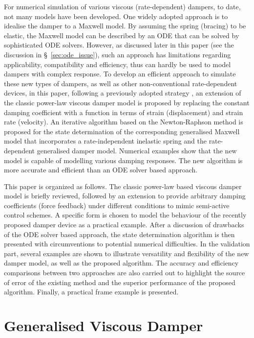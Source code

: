 For numerical simulation of various viscous (rate-dependent) dampers, to date, not many models have been developed. One widely adopted approach is to idealise the damper to a Maxwell model. By assuming the spring (bracing) to be elastic, the Maxwell model can be described by an ODE that can be solved by sophisticated ODE solvers. However, as discussed later in this paper (see the discussion in \S~\ref{sec:ode_issue}), such an approach has limitations regarding applicability, compatibility and efficiency, thus can hardly be used to model dampers with complex response. To develop an efficient approach to simulate these new types of dampers, as well as other non-conventional rate-dependent devices, in this paper, following a previously adopted strategy \citep[see, e.g.,][]{Symans1997,Symans1999a}, an extension of the classic power-law viscous damper model is proposed by replacing the constant damping coefficient with a function in terms of strain (displacement) and strain rate (velocity). An iterative algorithm based on the Newton-Raphson method is proposed for the state determination of the corresponding generalised Maxwell model that incorporates a rate-independent inelastic spring and the rate-dependent generalised damper model. Numerical examples show that the new model is capable of modelling various damping responses. The new algorithm is more accurate and efficient than an ODE solver based approach.

This paper is organized as follows. The classic power-law based viscous damper model is briefly reviewed, followed by an extension to provide arbitrary damping coefficients (force feedback) under different conditions to mimic semi-active control schemes. A specific form is chosen to model the behaviour of the recently proposed damper device \citep{Hazaveh2017} as a practical example. After a discussion of drawbacks of the ODE solver based approach, the state determination algorithm is then presented with circumventions to potential numerical difficulties. In the validation part, several examples are shown to illustrate versatility and flexibility of the new damper model, as well as the proposed algorithm. The accuracy and efficiency comparisons between two approaches are also carried out to highlight the source of error of the existing method and the superior performance of the proposed algorithm. Finally, a practical frame example is presented.
\section{Generalised Viscous Damper}
